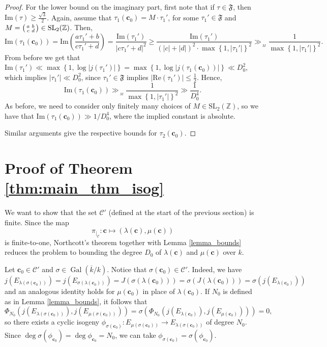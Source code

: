 \documentclass[11pt,a4paper,reqno]{amsart}
\numberwithin{equation}{section}
\newcommand{\Z}{\mathbb{Z}}
\renewcommand{\c}{\mathcal{C}}
\newcommand{\cc}{\mathbf{c}}
\renewcommand{\l}{\lambda}
\newcommand{\s}{\sigma}
\newcommand{\m}{\mu}
\newcommand{\pt}[1]{\left( #1 \right)}
\newcommand{\pg}[1]{\left\lbrace #1 \right\rbrace}
\newcommand{\abs}[1]{\left| #1 \right|}
\renewcommand{\Im}{\mathrm{Im}}
\renewcommand{\Re}{\mathrm{Re}}
\DeclareMathOperator{\Gal}{Gal}
\theoremstyle{remark}
\theoremstyle{definition}
\theoremstyle{definition}
\begin{document}
\begin{proof}
For the lower bound on the imaginary part, first note that if $\tau \in \mathfrak{F}$, then $\Im(\tau)\geq \frac{\sqrt{3}}{2}$. Again, assume that $\tau_1(\cc_0)=M \cdot \tau_1'$, for some $\tau_1' \in \mathfrak{F}$ and $M=\begin{psmallmatrix}
a & b \\ 
c & d
\end{psmallmatrix}\in \mathrm{SL}_2(\Z)$. Then,
$$\Im(\tau_1(\cc_0))=\Im\pt{\dfrac{a \tau_1'+b}{c \tau_1'+d}}=\dfrac{\Im(\tau_1')}{\abs{c\tau_1'+d}^2}\geq \dfrac{\Im(\tau_1')}{(\abs{c}+\abs{d})^2 \cdot \max\pg{1, \abs{\tau_1'}}^2}\gg_{\,\!{}_{M}} \dfrac{1}{\max\pg{1, \abs{\tau_1'}}^2}.$$
From before we get that $\Im(\tau_1')\ll \max\pg{1, \log\abs{j(\tau_1')}}= \max\pg{1, \log\abs{j(\tau_1(\cc_0))}} \ll D_0^2$, which implies $\abs{\tau_1'}\ll D_0^2$, since $\tau_1' \in \mathfrak{F}$ implies $\abs{\Re(\tau_1')}\leq \frac{1}{2}$. Hence,
$$\Im(\tau_1(\cc_0))\gg_{\,\!{}_{M}} \dfrac{1}{\max\pg{1, \abs{\tau_1'}}^2}\gg \dfrac{1}{D_0^4}.$$
As before, we need to consider only finitely many choices of $M \in \mathrm{SL}_2(\Z)$, so we have that $\Im(\tau_1(\cc_0))\gg 1/{D_0^4}$, where the implied constant is absolute.

Similar arguments give the respective bounds for $\tau_2(\cc_0)$.
\end{proof}

\section{Proof of Theorem \ref{thm:main_thm_isog}}
We want to show that the set $\c'$ (defined at the start of the previous section) is finite. Since the map 
$$\pi_{\vert_{\c}}: \cc \mapsto (\l(\cc), \m(\cc))$$
is finite-to-one, Northcott’s theorem together with Lemma \ref{lemma_bounds} reduces the problem to bounding the degree $D_0$ of $\l(\cc)$ and $\m(\cc)$ over $k$.

Let $\cc_0 \in \c'$ and $\s \in \Gal(\overline{k}/k)$. Notice that $\s(\cc_0) \in \c'$. Indeed, we have
$$j\pt{E_{\l(\s(\cc_0))}}=j\pt{E_{\s(\l(\cc_0))}}=J\pt{\s(\l(\cc_0))}=\s\pt{J\pt{\l(\cc_0)}}=\s\pt{j\pt{E_{\l(\cc_0)}}}$$
and an analogous identity holds for $\m(\cc_0)$ in place of $\l(\cc_0)$. If $N_0$ is defined as in Lemma \ref{lemma_bounds}, it follows that 
$$\Phi_{N_0}\pt{j\pt{E_{\l(\s(\cc_0))}},j\pt{E_{\m(\s(\cc_0))}}}=\s\pt{\Phi_{N_0}\pt{j\pt{E_{\l(\cc_0)}},j\pt{E_{\m(\cc_0)}}}}=0,$$
so there exists a cyclic isogeny $\phi_{\s(\cc_0)}: E_{\m(\s(\cc_0))} \to E_{\l(\s(\cc_0))}$ of degree $N_0$. Since $\deg \s(\phi_{\cc_0})= \deg \phi_{\cc_0}=N_0$, we can take $\phi_{\s(\cc_0)}=\s\pt{\phi_{\cc_0}}$.
\end{document}
